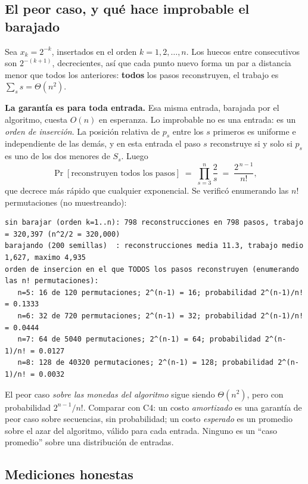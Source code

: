 \documentclass[11pt]{article}
\begin{document}
\subsection{El peor caso, y qué hace improbable el barajado}

Sea $x_k=2^{-k}$, insertados en el orden $k=1,2,\dots,n$. Los huecos entre consecutivos son
$2^{-(k+1)}$, decrecientes, así que cada punto nuevo forma un par a distancia menor que todos los
anteriores: \textbf{todos} los pasos reconstruyen, el trabajo es $\sum_s s=\Theta(n^2)$.

\textbf{La garantía es para toda entrada.} Esa misma entrada, barajada por el algoritmo, cuesta $O(n)$ en
esperanza. Lo improbable no es una entrada: es un \emph{orden de inserción}. La posición relativa de
$p_s$ entre los $s$ primeros es uniforme e independiente de las demás, y en esta entrada el paso $s$
reconstruye si y solo si $p_s$ es uno de los dos menores de $S_s$. Luego
\[
  \Pr[\text{reconstruyen todos los pasos}]\;=\;\prod_{s=3}^{n}\frac{2}{s}\;=\;\frac{2^{\,n-1}}{n!},
\]
que decrece más rápido que cualquier exponencial. Se verificó enumerando las $n!$ permutaciones (no
muestreando):
\begin{lstlisting}[style=salida,basicstyle=\ttfamily\footnotesize\color{black}]
sin barajar (orden k=1..n): 798 reconstrucciones en 798 pasos, trabajo = 320,397 (n^2/2 = 320,000)
barajando (200 semillas)  : reconstrucciones media 11.3, trabajo medio 1,627, maximo 4,935
orden de insercion en el que TODOS los pasos reconstruyen (enumerando las n! permutaciones):
   n=5: 16 de 120 permutaciones; 2^(n-1) = 16; probabilidad 2^(n-1)/n! = 0.1333
   n=6: 32 de 720 permutaciones; 2^(n-1) = 32; probabilidad 2^(n-1)/n! = 0.0444
   n=7: 64 de 5040 permutaciones; 2^(n-1) = 64; probabilidad 2^(n-1)/n! = 0.0127
   n=8: 128 de 40320 permutaciones; 2^(n-1) = 128; probabilidad 2^(n-1)/n! = 0.0032
\end{lstlisting}
El peor caso \emph{sobre las monedas del algoritmo} sigue siendo $\Theta(n^2)$, pero con probabilidad
$2^{n-1}/n!$. Comparar con C4: un costo \emph{amortizado} es una garantía de peor caso sobre secuencias,
sin probabilidad; un costo \emph{esperado} es un promedio sobre el azar del algoritmo, válido para cada
entrada. Ninguno es un ``caso promedio'' sobre una distribución de entradas.

\subsection{Mediciones honestas}
\end{document}
